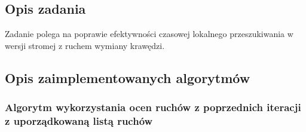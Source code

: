\documentclass[a4paper]{article}
\begin{document}
\subsection{Opis zadania}

Zadanie polega na poprawie efektywności czasowej lokalnego przeszukiwania w wersji stromej z ruchem wymiany krawędzi.

\subsection{Opis zaimplementowanych algorytmów}

\subsubsection{Algorytm wykorzystania ocen ruchów z poprzednich iteracji z uporządkowaną listą ruchów}
\end{document}
